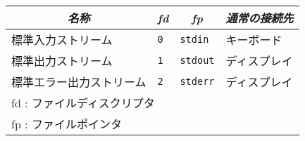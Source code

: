 \documentclass{standalone}
\begin{document}
\begin{tabular}{l|l|l|l}
\hline\hline
\multicolumn{1}{c}{\emph{名称}} &
\multicolumn{1}{|c}{\emph{fd}} &
\multicolumn{1}{|c}{\emph{fp}} &
\multicolumn{1}{|c}{\emph{通常の接続先}} \\
\hline
標準入力ストリーム       & \texttt{0} & \texttt{stdin}  & キーボード   \\
標準出力ストリーム       & \texttt{1} & \texttt{stdout} & ディスプレイ \\
標準エラー出力ストリーム & \texttt{2} & \texttt{stderr} & ディスプレイ \\
\hline
\multicolumn{4}{l}{\footnotesize fd : ファイルディスクリプタ} \\
\multicolumn{4}{l}{\footnotesize fp : ファイルポインタ}
\end{tabular}
\end{document}

